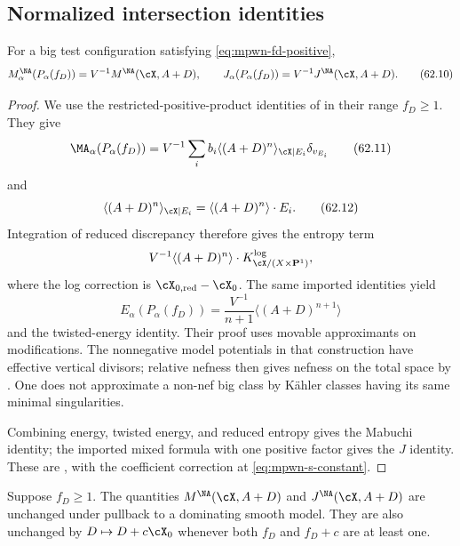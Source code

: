 \subsection{Normalized intersection identities}
\label{subsec:mpwn-k-intersection-identities}

\begin{theorem}\label{thm:mpwn-model-intersection-formulas}
For a big test configuration satisfying
\eqref{eq:mpwn-fd-positive},
\[
 M_\alpha^{\NA}(P_\alpha(f_D))
      =V^{-1}M^{\NA}(\cX,A+D),
\qquad
 J_\alpha(P_\alpha(f_D))
      =V^{-1}J^{\NA}(\cX,A+D).
\tag{62.10}\label{eq:mpwn-model-functional-identities}
\]
\end{theorem}

\begin{proof}
We use the restricted-positive-product identities of
\cite[Propositions~9.1.2, 9.1.3, and 9.1.5]{MPWN25}
in their range $f_D\geq1$.  They give
\[
 \MA_\alpha(P_\alpha(f_D))
 =V^{-1}\sum_i b_i
       \langle(A+D)^n\rangle_{\cX\mid E_i}\delta_{v_{E_i}}
\tag{62.11}\label{eq:mpwn-big-envelope-ma}
\]
and
\[
 \langle(A+D)^n\rangle_{\cX\mid E_i}
       =\langle(A+D)^n\rangle\cdot E_i.
\tag{62.12}\label{eq:mpwn-restricted-positive}
\]
Integration of reduced discrepancy therefore gives the entropy term
\[
 V^{-1}\langle(A+D)^n\rangle\cdot
 K^{\log}_{\cX/(X\times\mathbf P^1)},
\]
where the log correction is $\cX_{0,\mathrm{red}}-\cX_0$.
The same imported identities yield
\[
 E_\alpha(P_\alpha(f_D))
    =\frac{V^{-1}}{n+1}\langle(A+D)^{n+1}\rangle
\tag{62.13}\label{eq:mpwn-envelope-energy-positive-product}
\]
and the twisted-energy identity.  Their proof uses movable
approximants on modifications.  The nonnegative model potentials
in that construction have effective vertical divisors; relative
nefness then gives nefness on the total space by
\cite[Lemma~9.1.4]{MPWN25}.
One does not approximate a non-nef big class by K\"ahler classes
having its same minimal singularities.

Combining energy, twisted energy, and reduced entropy gives the
Mabuchi identity; the imported mixed formula with one positive
factor gives the $J$ identity.  These are
\cite[Theorem~9.1.1]{MPWN25}, with the coefficient correction at
\eqref{eq:mpwn-s-constant}.
\end{proof}

\begin{proposition}\label{prop:mpwn-invariant-invariance}
Suppose $f_D\geq1$.  The quantities
$M^{\NA}(\cX,A+D)$ and $J^{\NA}(\cX,A+D)$ are unchanged under
pullback to a dominating smooth model.
They are also unchanged by $D\mapsto D+c\cX_0$ whenever
both $f_D$ and $f_D+c$ are at least one.
\end{proposition}


